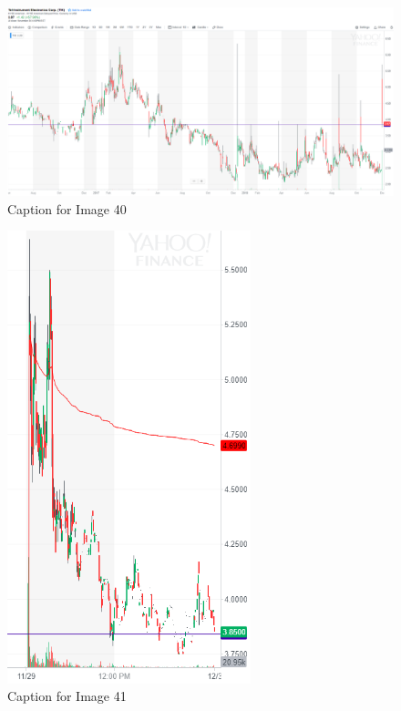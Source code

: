 \documentclass{article}
\begin{document}
\vspace{10pt}

\begin{figure}[!htb]
    \centering
    \includegraphics[width=\textwidth]{imgs/40.png}
    \caption{Caption for Image 40}
\end{figure}

\vspace{10pt}

\begin{figure}[!htb]
    \centering
    \includegraphics[width=200pt]{imgs/41.png}
    \caption{Caption for Image 41}
\end{figure}

\vspace{10pt}
\end{document}
